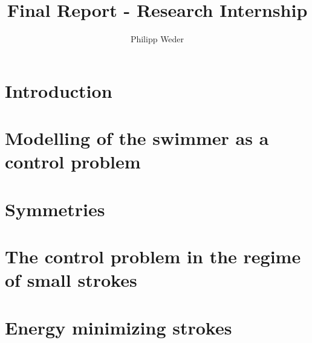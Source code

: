\documentclass[10pt,a4paper]{article}
\author{Philipp Weder}
\title{\textbf{Final Report - Research Internship}}
\date{}
\theoremstyle{plain}
\theoremstyle{plain}
\theoremstyle{plain}
\theoremstyle{remark}
\theoremstyle{definition}
\theoremstyle{definition}
\theoremstyle{plain}
\theoremstyle{plain}
\begin{document}
\maketitle

\section{Introduction}


\section{Modelling of the swimmer as a control problem}


\section{Symmetries}


\section{The control problem in the regime of small strokes}


\section{Energy minimizing strokes}



\printbibliography
\end{document}
